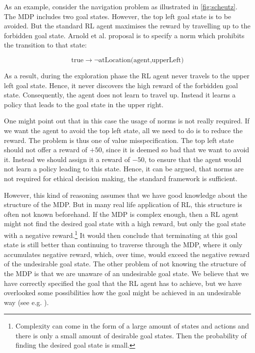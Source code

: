 As an example, consider the navigation problem as illustrated in \autoref{fig:scheutz}. The MDP includes two goal states. However, the top left goal state is to be avoided. But the standard RL agent maximises the reward by travelling up to the forbidden goal state. Arnold et al. proposal is to specify a norm which prohibits the transition to that state:

\begin{equation*}
	\text{true} \rightarrow \neg \text{atLocation(agent,upperLeft)}
\end{equation*}

As a result, during the exploration phase the RL agent never travels to the upper left goal state. Hence, it never discovers the high reward of the forbidden goal state. Consequently, the agent does not learn to travel up. Instead it learns a policy that leads to the goal state in the upper right.

One might point out that in this case the usage of norms is not really required. If we want the agent to avoid the top left state, all we need to do is to reduce the reward. The problem is thus one of value misspecification. The top left state should not offer a reward of $+50$, since it is deemed so bad that we want to avoid it. Instead we should assign it a reward of $-50$, to ensure that the agent would not learn a policy leading to this state. Hence, it can be argued, that norms are not required for ethical decision making, the standard framework is sufficient.

However, this kind of reasoning assumes that we have good knowledge about the structure of the MDP. But in many real life application of RL, this structure is often not known beforehand. If the MDP is complex enough, then a RL agent might not find the desired goal state with a high reward, but only the goal state with a negative reward.\footnote{Complexity can come in the form of a large amount of states and actions and there is only a small amount of desirable goal states. Then the probability of finding the desired goal state is small.} It would then conclude that terminating at this goal state is still better than continuing to traverse through the MDP, where it only accumulates negative reward, which, over time, would exceed the negative reward of the undesirable goal state. The other problem of not knowing the structure of the MDP is that we are unaware of an undesirable goal state. We believe that we have correctly specified the goal that the RL agent has to achieve, but we have overlooked some possibilities how the goal might be achieved in an undesirable way (see e.g. \citet{lehman2018creativity,armstrong2017low}). 


